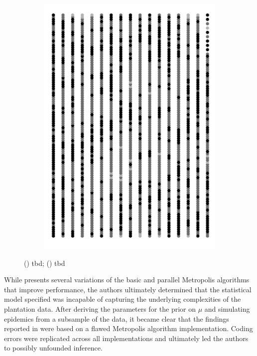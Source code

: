 \documentclass{uwstat572}
\begin{document}
\begin{figure}[H]
\begin{subfigure}[b]{0.24\textwidth}
		\includegraphics[width=\textwidth]{figures/figure_5d.png}
		\caption{}
		\label{fig:week_60}
	\end{subfigure}
	\caption{() tbd; () tbd }
	\label{fig:data_plot}
\end{figure} 

While \citet{Brown} presents several variations of the basic and parallel Metropolis algorithms that improve performance, the authors ultimately determined that the statistical model specified was incapable of capturing the underlying complexities of the plantation data. 
After deriving the parameters for the prior on $\mu$ and simulating epidemics from a subsample of the data, it became clear that the findings reported in \citet{Brown} were based on a flawed Metropolis algorithm implementation. 
Coding errors were replicated across all implementations and ultimately led the authors to possibly unfounded inference. 
\end{document}
